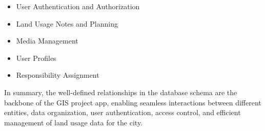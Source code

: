 \begin{itemize}
    \item User Authentication and Authorization
    \item Land Usage Notes and Planning
    \item Media Management
    \item User Profiles
    \item Responsibility Assignment
\end{itemize}

In summary, the well-defined relationships in the database schema are the backbone of the GIS project app, enabling seamless interactions between different entities, data organization, user authentication, access control, and efficient management of land usage data for the city.
